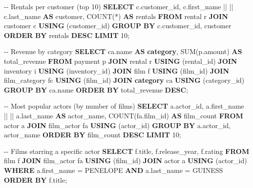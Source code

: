 \documentclass[
  letterpaper,
  DIV=11,
  numbers=noendperiod]{scrartcl}
\newenvironment{Shaded}{\begin{snugshade}}{\end{snugshade}}
\newcommand{\CommentTok}[1]{\textcolor[rgb]{0.37,0.37,0.37}{#1}}
\newcommand{\DecValTok}[1]{\textcolor[rgb]{0.68,0.00,0.00}{#1}}
\newcommand{\FunctionTok}[1]{\textcolor[rgb]{0.28,0.35,0.67}{#1}}
\newcommand{\KeywordTok}[1]{\textcolor[rgb]{0.00,0.23,0.31}{\textbf{#1}}}
\newcommand{\NormalTok}[1]{\textcolor[rgb]{0.00,0.23,0.31}{#1}}
\newcommand{\OperatorTok}[1]{\textcolor[rgb]{0.37,0.37,0.37}{#1}}
\newcommand{\StringTok}[1]{\textcolor[rgb]{0.13,0.47,0.30}{#1}}
\begin{document}
\begin{Shaded}
\begin{Highlighting}[]
\CommentTok{{-}{-} Rentals per customer (top 10)}
\KeywordTok{SELECT}\NormalTok{ c.customer\_id,}
\NormalTok{       c.first\_name }\OperatorTok{||} \StringTok{\textquotesingle{} \textquotesingle{}} \OperatorTok{||}\NormalTok{ c.last\_name }\KeywordTok{AS}\NormalTok{ customer,}
       \FunctionTok{COUNT}\NormalTok{(}\OperatorTok{*}\NormalTok{) }\KeywordTok{AS}\NormalTok{ rentals}
\KeywordTok{FROM}\NormalTok{ rental r}
\KeywordTok{JOIN}\NormalTok{ customer c }\KeywordTok{USING}\NormalTok{ (customer\_id)}
\KeywordTok{GROUP} \KeywordTok{BY}\NormalTok{ c.customer\_id, customer}
\KeywordTok{ORDER} \KeywordTok{BY}\NormalTok{ rentals }\KeywordTok{DESC}
\KeywordTok{LIMIT} \DecValTok{10}\NormalTok{;}

\CommentTok{{-}{-} Revenue by category}
\KeywordTok{SELECT}\NormalTok{ ca.name }\KeywordTok{AS} \KeywordTok{category}\NormalTok{,}
       \FunctionTok{SUM}\NormalTok{(p.amount) }\KeywordTok{AS}\NormalTok{ total\_revenue}
\KeywordTok{FROM}\NormalTok{ payment p}
\KeywordTok{JOIN}\NormalTok{ rental r }\KeywordTok{USING}\NormalTok{ (rental\_id)}
\KeywordTok{JOIN}\NormalTok{ inventory i }\KeywordTok{USING}\NormalTok{ (inventory\_id)}
\KeywordTok{JOIN}\NormalTok{ film f }\KeywordTok{USING}\NormalTok{ (film\_id)}
\KeywordTok{JOIN}\NormalTok{ film\_category fc }\KeywordTok{USING}\NormalTok{ (film\_id)}
\KeywordTok{JOIN} \KeywordTok{category}\NormalTok{ ca }\KeywordTok{USING}\NormalTok{ (category\_id)}
\KeywordTok{GROUP} \KeywordTok{BY}\NormalTok{ ca.name}
\KeywordTok{ORDER} \KeywordTok{BY}\NormalTok{ total\_revenue }\KeywordTok{DESC}\NormalTok{;}

\CommentTok{{-}{-} Most popular actors (by number of films)}
\KeywordTok{SELECT}\NormalTok{ a.actor\_id,}
\NormalTok{       a.first\_name }\OperatorTok{||} \StringTok{\textquotesingle{} \textquotesingle{}} \OperatorTok{||}\NormalTok{ a.last\_name }\KeywordTok{AS}\NormalTok{ actor\_name,}
       \FunctionTok{COUNT}\NormalTok{(fa.film\_id) }\KeywordTok{AS}\NormalTok{ film\_count}
\KeywordTok{FROM}\NormalTok{ actor a}
\KeywordTok{JOIN}\NormalTok{ film\_actor fa }\KeywordTok{USING}\NormalTok{ (actor\_id)}
\KeywordTok{GROUP} \KeywordTok{BY}\NormalTok{ a.actor\_id, actor\_name}
\KeywordTok{ORDER} \KeywordTok{BY}\NormalTok{ film\_count }\KeywordTok{DESC}
\KeywordTok{LIMIT} \DecValTok{10}\NormalTok{;}

\CommentTok{{-}{-} Films starring a specific actor}
\KeywordTok{SELECT}\NormalTok{ f.title, f.release\_year, f.rating}
\KeywordTok{FROM}\NormalTok{ film f}
\KeywordTok{JOIN}\NormalTok{ film\_actor fa }\KeywordTok{USING}\NormalTok{ (film\_id)}
\KeywordTok{JOIN}\NormalTok{ actor a }\KeywordTok{USING}\NormalTok{ (actor\_id)}
\KeywordTok{WHERE}\NormalTok{ a.first\_name }\OperatorTok{=} \StringTok{\textquotesingle{}PENELOPE\textquotesingle{}} \KeywordTok{AND}\NormalTok{ a.last\_name }\OperatorTok{=} \StringTok{\textquotesingle{}GUINESS\textquotesingle{}}
\KeywordTok{ORDER} \KeywordTok{BY}\NormalTok{ f.title;}


\end{Highlighting}
\end{Shaded}
\end{document}
